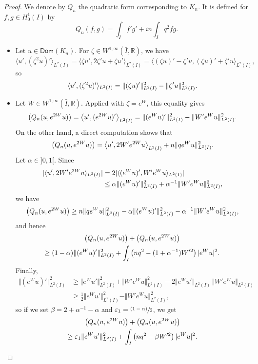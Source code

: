 \documentclass[11pt]{article}
\numberwithin{equation}{section}
\newcommand{\psfrac}[2]{\sfrac{(#1)}{#2}}
\theoremstyle{plain}
\theoremstyle{definition}
\newcommand{\abs}[1]{\vert #1\vert}
\newcommand{\nr}[1]{\Vert #1\Vert}
\newcommand{\binnp}[2]{\bigl\langle #1 , #2 \bigr\rangle}
\newcommand{\inv}{^{-1}}
\newcommand{\1}{\mathds 1}
\let\Re\relax
\DeclareMathOperator{\Re}{\mathsf{Re}\mkern2mu}
\let\Im\relax
\DeclareMathOperator{\Im}{\mathsf{Im}\mkern2mu}
\newcommand{\Dom}{\mathsf{Dom}}
\newcommand{\R}{\mathbb{R}}
\let\a\alpha
\let\e\varepsilon
\let\z\zeta
\begin{document}
\begin{proof}
We denote by $Q_n$ the quadratic form corresponding to $K_n$. It is defined for $f,g \in H_0^1(I)$ by
\[
Q_n(f,g) = \int_I f' \bar g' + i n \int_I q^2 f \bar g.
\]

\begin{itemize}
\item
Let $u \in \Dom(K_n)$. For $\zeta \in W^{1,\infty}(\bar I,\R)$, we have
\[
\binnp{u'}{(\zeta^2 u)'}_{L^2(I)} = \binnp{\z u'}{2\z'u + \z u'}_{L^2(I)} = \binnp{(\zeta u)' - \zeta' u}{(\zeta u)' + \zeta' u}_{L^2(I)},
\]
so
\begin{equation*}
\Re \innp{u'}{(\zeta^2 u)'}_{L^2(I)} = \nr{(\zeta u)'}^2_{L^2(I)} - \nr{\zeta' u}^2_{L^2(I)}.
\end{equation*}

\item
Let $W \in W^{1,\infty}(\bar I,\R)$. Applied with $\zeta = e^{W}$, this equality gives
\begin{equation*}
\Re \bigl(Q_n (u,e^{2W}u) \bigr) = \Re \binnp{u'}{(e^{2W} u)'}_{L^2(I)} = \nr{(e^{W}u)'}^2_{L^2(I)} - \nr{W' e^W u}^2_{L^2(I)}.
\end{equation*}
On the other hand, a direct computation shows that
\[
\Im \bigl(Q_n (u,e^{2W}u) \bigr) = \Im \binnp{u'}{2W' e^{2W} u}_{L^2(I)} + n \nr{q e^W u}^2_{L^2(I)}.
\]
Let $\a \in{}]0,1[$. Since
\begin{align*}
\abs{\Im \innp{u'}{2W' e^{2W} u}_{L^2(I)}}
& = 2 \abs{\Im \innp{(e^W u)'}{W' e^{W} u}_{L^2(I)}} \\
& \leq \a \nr{(e^W u)'}^2_{L^2(I)} + \a\inv\nr{W' e^W u}^2_{L^2(I)},
\end{align*}
we have
\[
\Im \bigl(Q_n (u,e^{2W}u) \bigr) \geq n \nr{q e^W u}^2_{L^2(I)} - \a \nr{(e^W u)'}^2_{L^2(I)} - \a\inv\nr{W' e^W u}^2_{L^2(I)},
\]
and hence
\begin{multline*}
\Re \bigl(Q_n (u,e^{2W}u) \bigr) + \Im \bigl(Q_n (u,e^{2W}u) \bigr)\\
\geq (1-\a) \nr{(e^{W}u)'}^2_{L^2(I)} + \int_{I} \left(nq^2 - (1+\a\inv) W'^2 \right) |e^W u|^2 .
\end{multline*}
Finally,
\begin{align*}
\nr{(e^{W}u)'}^2_{L^2(I)}
& \geq \nr{e^W u'}^2_{L^2(I)} + \nr{W' e^W u}^2_{L^2(I)} - 2\nr{e^W u'}_{L^2(I)}\,\nr{W' e^W u}_{L^2(I)}\\
& \geq \frac 12 \nr{e^W u'}^2_{L^2(I)} - \nr{W' e^W u}^2_{L^2(I)},
\end{align*}
so if we set $\beta = 2 + \a\inv - \a$ and $\e_1 = \psfrac {1-\a} 2$, we get
\begin{multline} \label{minor-Re-Im-Q}
\Re \bigl(Q_n (u,e^{2W}u) \bigr) + \Im \bigl(Q_n (u,e^{2W}u) \bigr)\\
\geq \e_1 \nr{e^{W}u'}^2_{L^2(I)} + \int_{I} \left(nq^2 - \beta W'^2 \right) |e^W u|^2 .
\end{multline}


\end{itemize}
\end{proof}
\end{document}

